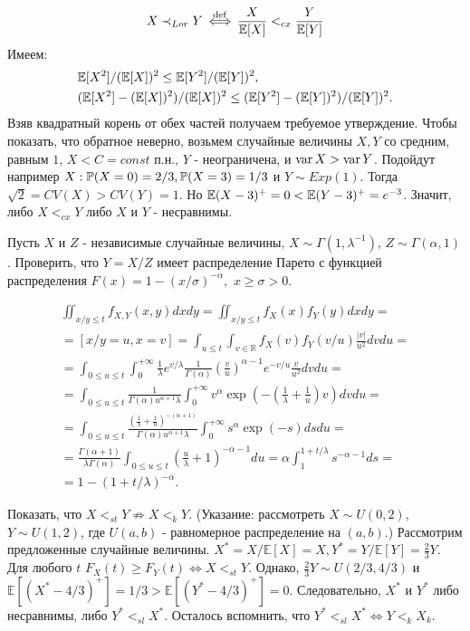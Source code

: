 $$X \prec_{Lor} Y \iffdef \frac{X}{\E[X]} <_{cx} \frac{Y}{\E[Y]}$$
Имеем: 
\begin{align}
    & \E [X^2] / (\E [X])^2 \leq \E[Y^2 ]/ (\E[Y])^2, \\
    & (\E[X^2] - (\E[X])^2)/ (\E[X])^2 \leq (\E[Y^2] - (\E[Y])^2) / (\E[Y])^2.
\end{align}
Взяв квадратный корень от обех частей получаем требуемое утверждение.
Чтобы показать, что обратное неверно, возьмем случайные величины $X,Y$ со средним, равным $1$, $X<C=const$ п.н., $Y$ - неограничена, и $\var X > \var Y $. Подойдут например $X: \P(X=0) = 2/3, \P (X = 3) = 1/3$ и $Y \sim Exp(1).$ Тогда $\sqrt 2 = CV(X) > CV(Y) = 1 $. Но $\E(X - 3)^+ = 0 < \E(Y - 3)^+ = e^{-3}$. Значит, либо $X<_{cx} Y$ либо $X$ и $Y$ - несравнимы. 

\problem{}
Пусть $X$ и $Z$ - независимые случайные величины, $X \sim \Gamma(1, \lambda^{-1})$, $Z \sim \Gamma(\alpha, 1)$. Проверить, что $Y = X/Z$ имеет распределение Парето с функцией распределения $F(x) = 1 - (x/\sigma)^{-\alpha},$ $x \geq \sigma > 0$.
\solution{}

\begin{multline*}
    \iint_{x/y \leq t} f_{X,Y}(x,y)dxdy = \iint_{x/y \leq t} f_{X}(x) f_Y(y)dxdy =\\= \left[x/y = u, x = v \right] =
    \int_{u\leq t}\int_{v \in \mathbb R}f_X(v)f_Y(v/u)\frac{|v|}{u^2}dvdu =\\= 
    \int_{0\leq u\leq t}\int_0^{+\infty} \frac{1}{\lambda}e^{v/\lambda} \frac{1}{\Gamma(\alpha)}\left( \frac{v}{u}\right)^{\alpha - 1} e^{-v/u} \frac{v}{u^2} dv du =\\= 
    \int_{0\leq u\leq t}\frac{1}{\Gamma(\alpha) u^{\alpha +1} \lambda}\int_0^{+\infty} v^\alpha \exp\left(-(\frac1\lambda + \frac1u)v\right) dv du =\\= 
    \int_{0\leq u\leq t}\frac{(\frac1\lambda + \frac1u)^{-(\alpha +1)}}{\Gamma(\alpha) u^{\alpha +1} \lambda}\int_0^{+\infty} s^\alpha \exp\left(-s\right) ds du =\\= \frac{\Gamma(\alpha + 1)}{\lambda\Gamma(\alpha)} \int_{0\leq u\leq t} \left(\frac u\lambda + 1 \right)^{-\alpha - 1}du = \alpha \int_1^{1+ t/\lambda} s^{-\alpha - 1}ds = \\ = 1 - (1 + t/\lambda)^{-\alpha}.
\end{multline*}

\problem{}
Показать, что $ X <_{st} Y \not\Rightarrow X <_k Y $. (Указание: рассмотреть $X \sim U(0, 2)$, $Y \sim U(1, 2)$, где $U(a, b)$ - равномерное
распределение на $(a, b)$.)
\solution{}
Рассмотрим предложенные случайные величины. $X^* = X/\mathbb E[X] = X, Y^* = Y/\mathbb E [Y] = \frac{2}{3}Y$. Для любого $t$ $F_X(t)\geq F_Y(t) \iff X<_{st} Y$. Однако, $\frac{2}{3}Y \sim U(2/3, 4/3)$ и $\mathbb E[(X^* - 4/3)^+] = 1/3 > \mathbb E [(Y^* - 4/3)^+] = 0$. Следовательно, $X^*$ и $Y^*$ либо несравнимы, либо $Y^* <_{sl} X^*$. Осталось вспомнить, что $Y^* <_{sl} X^* \Leftrightarrow Y <_{k} X_{k}$.

